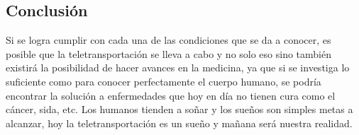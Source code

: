 \documentclass{bmcart}
\begin{document}
\subsection*{Conclusión}
Si se logra cumplir con cada una de las condiciones que se da a conocer, es posible que la teletransportación se lleva a cabo y no solo eso sino también existirá la posibilidad de hacer avances en la medicina, ya que si se investiga lo suficiente como para conocer perfectamente el cuerpo humano, se podría encontrar la solución a enfermedades que hoy en día no tienen cura como el cáncer, sida, etc. 
Los humanos tienden a soñar y los sueños son simples metas a alcanzar, hoy la teletransportación es un sueño y mañana será nuestra realidad.


\begin{backmatter}

 \begin{thebibliography}
 \end{thebibliography}

\end{backmatter}
\end{document}

